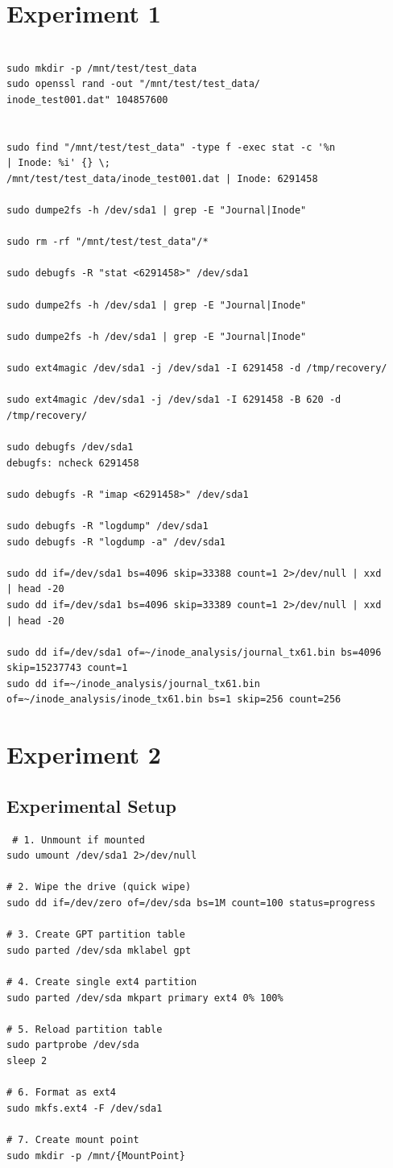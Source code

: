 \section{Experiment 1}

\begin{verbatim}

sudo mkdir -p /mnt/test/test_data
sudo openssl rand -out "/mnt/test/test_data/
inode_test001.dat" 104857600


sudo find "/mnt/test/test_data" -type f -exec stat -c '%n 
| Inode: %i' {} \;
/mnt/test/test_data/inode_test001.dat | Inode: 6291458

sudo dumpe2fs -h /dev/sda1 | grep -E "Journal|Inode"

sudo rm -rf "/mnt/test/test_data"/*

sudo debugfs -R "stat <6291458>" /dev/sda1

sudo dumpe2fs -h /dev/sda1 | grep -E "Journal|Inode"

sudo dumpe2fs -h /dev/sda1 | grep -E "Journal|Inode"

sudo ext4magic /dev/sda1 -j /dev/sda1 -I 6291458 -d /tmp/recovery/

sudo ext4magic /dev/sda1 -j /dev/sda1 -I 6291458 -B 620 -d 
/tmp/recovery/

sudo debugfs /dev/sda1
debugfs: ncheck 6291458

sudo debugfs -R "imap <6291458>" /dev/sda1

sudo debugfs -R "logdump" /dev/sda1
sudo debugfs -R "logdump -a" /dev/sda1

sudo dd if=/dev/sda1 bs=4096 skip=33388 count=1 2>/dev/null | xxd 
| head -20
sudo dd if=/dev/sda1 bs=4096 skip=33389 count=1 2>/dev/null | xxd 
| head -20

sudo dd if=/dev/sda1 of=~/inode_analysis/journal_tx61.bin bs=4096 
skip=15237743 count=1
sudo dd if=~/inode_analysis/journal_tx61.bin 
of=~/inode_analysis/inode_tx61.bin bs=1 skip=256 count=256
\end{verbatim}

\section{Experiment 2}
\subsection{Experimental Setup}
\begin{verbatim}
 # 1. Unmount if mounted
sudo umount /dev/sda1 2>/dev/null

# 2. Wipe the drive (quick wipe)
sudo dd if=/dev/zero of=/dev/sda bs=1M count=100 status=progress

# 3. Create GPT partition table
sudo parted /dev/sda mklabel gpt

# 4. Create single ext4 partition
sudo parted /dev/sda mkpart primary ext4 0% 100%

# 5. Reload partition table
sudo partprobe /dev/sda
sleep 2

# 6. Format as ext4
sudo mkfs.ext4 -F /dev/sda1

# 7. Create mount point
sudo mkdir -p /mnt/{MountPoint}

\end{verbatim}

